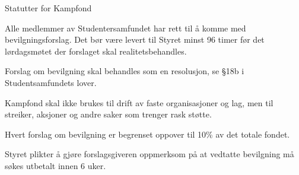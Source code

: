 \begin{fond}{Statutter for Kampfond}

  \begin{fondsparagraf}{}
Alle medlemmer av Studentersamfundet har rett til å komme med bevilgningsforslag. Det bør være levert til Styret
minst 96 timer før det lørdagsmøtet der forslaget skal realitetsbehandles.
  \end{fondsparagraf}

  \begin{fondsparagraf}{}
Forslag om bevilgning skal behandles som en resolusjon, se §18b i Studentsamfundets lover.
  \end{fondsparagraf}
  
  \begin{fondsparagraf}{}
Kampfond skal ikke brukes til drift av faste organisasjoner og lag, men til streiker, aksjoner og andre saker som
trenger rask støtte.
  \end{fondsparagraf}
  
  \begin{fondsparagraf}{}
Hvert forslag om bevilgning er begrenset oppover til 10\% av det totale fondet.
  \end{fondsparagraf}
  
  \begin{fondsparagraf}{}
Styret plikter å gjøre forslagsgiveren oppmerksom på at vedtatte bevilgning må søkes utbetalt innen 6 uker.
  \end{fondsparagraf}  

\end{fond}

